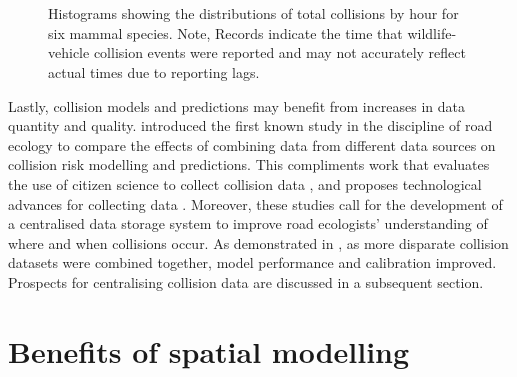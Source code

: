 \begin{figure*}[!t]
  \centering
	\begin{minipage}[t]{.9\textwidth}
    	\centering
    	\hspace{.05\textwidth}
    	\\ 
    	\hspace{.05\textwidth}
    	\\
    	\hspace{.05\textwidth}
    \end{minipage}
  \caption[Total collisions by hour for six mammal species]{Histograms showing the distributions of total collisions by hour for six mammal species. Note, Records indicate the time that wildlife-vehicle collision events were reported and may not accurately reflect actual times due to reporting lags.}
  \label{temporal_all}
\end{figure*}

Lastly, collision models and predictions may benefit from increases in data quantity and quality.  introduced the first known study in the discipline of road ecology to compare the effects of combining data from different data sources on collision risk modelling and predictions. This compliments work that evaluates the use of citizen science to collect collision data \citep{paul14, dwye16}, and proposes technological advances for collecting data \citep{olso14}. Moreover, these studies call for the development of a centralised data storage system to improve road ecologists' understanding of where and when collisions occur. As demonstrated in , as more disparate collision datasets were combined together, model performance and calibration improved. Prospects for centralising collision data are discussed in a subsequent section. 

\section{Benefits of spatial modelling}

